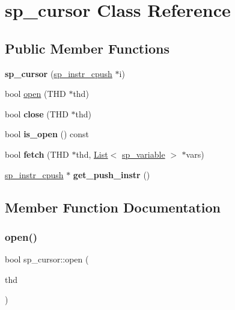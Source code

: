 \hypertarget{classsp__cursor}{}\section{sp\+\_\+cursor Class Reference}
\label{classsp__cursor}
\subsection*{Public Member Functions}
\begin{DoxyCompactItemize}
\item 
\mbox{\label{classsp__cursor_ab905090ab7bbe3ed37d1eccd5754938c}} 
{\bfseries sp\+\_\+cursor} (\mbox{\hyperlink{classsp__instr__cpush}{sp\+\_\+instr\+\_\+cpush}} $\ast$i)
\item 
bool \mbox{\hyperlink{classsp__cursor_a471dd99edd0a54c56736134647025df2}{open}} (T\+HD $\ast$thd)
\item 
\mbox{\label{classsp__cursor_a05e20201335c79154b6a6dd49147b5c7}} 
bool {\bfseries close} (T\+HD $\ast$thd)
\item 
\mbox{\label{classsp__cursor_a1b02c6517211eace79d4a3bf18fcca24}} 
bool {\bfseries is\+\_\+open} () const
\item 
\mbox{\label{classsp__cursor_ae607b575efaeefb033ffda5da0b20d85}} 
bool {\bfseries fetch} (T\+HD $\ast$thd, \mbox{\hyperlink{classList}{List}}$<$ \mbox{\hyperlink{classsp__variable}{sp\+\_\+variable}} $>$ $\ast$vars)
\item 
\mbox{\label{classsp__cursor_a59c8c1c0b65ad45703c2f78278a5ebb7}} 
\mbox{\hyperlink{classsp__instr__cpush}{sp\+\_\+instr\+\_\+cpush}} $\ast$ {\bfseries get\+\_\+push\+\_\+instr} ()
\end{DoxyCompactItemize}


\subsection{Member Function Documentation}
\mbox{\label{classsp__cursor_a471dd99edd0a54c56736134647025df2}} 
\subsubsection{\texorpdfstring{open()}{open()}}
{\footnotesize\ttfamily bool sp\+\_\+cursor\+::open (\begin{DoxyParamCaption}\item[{T\+HD $\ast$}]{thd }\end{DoxyParamCaption})}


